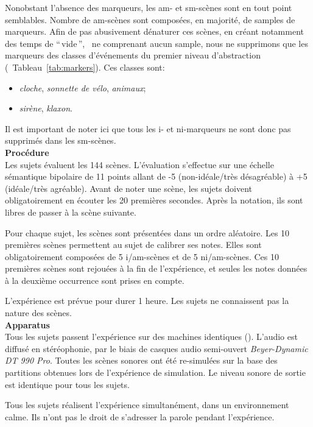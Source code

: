 Nonobstant l'absence des marqueurs, les am- et sm-scènes sont en tout point semblables. Nombre de am-scènes sont composées, en majorité, de samples de marqueurs. Afin de pas abusivement dénaturer ces scènes, en créant notamment des temps de ``\,vide\,'', \ie~ne comprenant aucun sample, nous ne supprimons que les marqueurs des classes d'événements du premier niveau d'abstraction (\cf~Tableau~\ref{tab:markers}). Ces classes sont: 

\begin{itemize}
\item \emph{cloche}, \emph{sonnette de vélo}, \emph{animaux};
\item \emph{sirène}, \emph{klaxon}.
\end{itemize}
 
Il est important de noter ici que tous les i- et ni-marqueurs ne sont donc pas supprimés dans les sm-scènes. \\
 
\textbf{Procédure} \\

Les sujets évaluent les 144 scènes. L'évaluation s'effectue sur une échelle sémantique bipolaire de 11 points allant de -5 (non-idéale/très désagréable) à +5 (idéale/très agréable). Avant de noter une scène, les sujets doivent obligatoirement en écouter les 20 premières secondes. Après la notation, ils sont libres de passer à la scène suivante.

Pour chaque sujet, les scènes sont présentées dans un ordre aléatoire. Les 10 premières scènes permettent au sujet de calibrer ses notes. Elles sont obligatoirement composées de 5 i/am-scènes et de 5 ni/am-scènes. Ces 10 premières scènes sont rejouées à la fin de l'expérience, et seules les notes données à la deuxième occurrence sont prises en compte. 

L'expérience est prévue pour durer 1 heure. Les sujets ne connaissent pas la nature des scènes.\\

\textbf{Apparatus} \\

Tous les sujets passent l'expérience sur des machines identiques (). L'audio est diffusé en stéréophonie, par le biais de casques audio semi-ouvert \emph{Beyer-Dynamic DT 990 Pro}. Toutes les scènes sonores ont été re-simulées sur la base des partitions obtenues lors de l'expérience de simulation. Le niveau sonore de sortie est identique pour tous les sujets.

Tous les sujets réalisent l'expérience simultanément, dans un environnement calme. Ils n'ont pas le droit de s'adresser la parole pendant l'expérience. 

